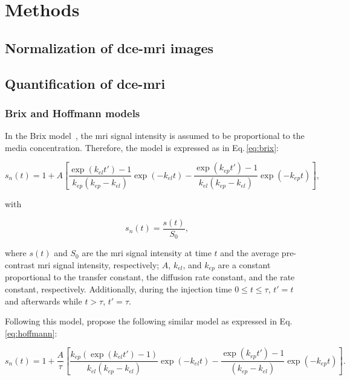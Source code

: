 \section{Methods}\label{sec:methods}

\subsection{Normalization of \ac{dce}-\ac{mri} images}\label{sec:norm}

\subsection{Quantification of \ac{dce}-\ac{mri}}\label{sec:stateart}

\subsubsection{Brix and Hoffmann models}

In the Brix model~\citep{brix1991pharmacokinetic}, the \ac{mri} signal intensity is assumed to be proportional to the media concentration.
Therefore, the model is expressed as in Eq.\,\eqref{eq:brix}:

\begin{equation}
  s_n(t) = 1 + A \left[ \frac{\exp(k_{el} t') - 1}{k_{ep}(k_{ep} - k_{el})} \exp(- k_{el} t) - \frac{\exp(k_{ep} t') - 1}{k_{el}(k_{ep} - k_{el})} \exp(- k_{ep} t) \right],
  \label{eq:brix}
\end{equation}

\noindent with

\begin{equation}
  s_n(t) = \frac{s(t)}{S_0},
  \label{eq:enh}
\end{equation}

\noindent where $s(t)$ and $S_0$ are the \ac{mri} signal intensity at time $t$ and the average pre-contrast \ac{mri} signal intensity, respectively; $A$, $k_{el}$, and $k_{ep}$ are a constant proportional to the transfer constant, the diffusion rate constant, and the rate constant, respectively. Additionally, during the injection time $0 \leq t \leq \tau$, $t' = t$ and afterwards while $t > \tau$, $t' = \tau$.

Following this model, \citeauthor{hoffmann1995pharmacokinetic} propose the following similar model as expressed in Eq.\,\eqref{eq:hoffmann}:

\begin{equation}
  s_n(t) = 1 + \frac{A}{\tau} \left[ \frac{k_{ep} \left( \exp(k_{el} t') - 1 \right)}{k_{el}(k_{ep} - k_{el})} \exp(- k_{el} t) - \frac{\exp(k_{ep} t') - 1}{(k_{ep} - k_{el})} \exp(- k_{ep} t) \right].
  \label{eq:hoffmann}
\end{equation}

